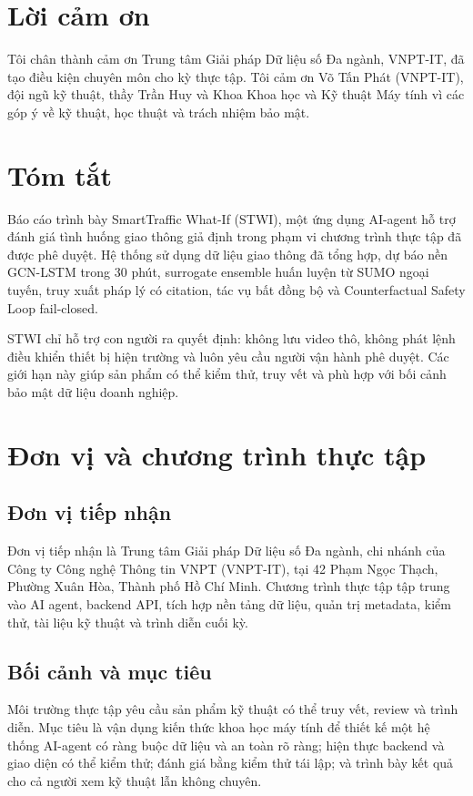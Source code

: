 \documentclass[12pt,a4paper]{report}
\newcommand{\enterpriseMentor}{Võ Tấn Phát (VNPT-IT)}
\begin{document}
\chapter*{Lời cảm ơn}
Tôi chân thành cảm ơn Trung tâm Giải pháp Dữ liệu số Đa ngành, VNPT-IT, đã tạo điều kiện chuyên môn cho kỳ thực tập. Tôi cảm ơn \enterpriseMentor, đội ngũ kỹ thuật, thầy Trần Huy và Khoa Khoa học và Kỹ thuật Máy tính vì các góp ý về kỹ thuật, học thuật và trách nhiệm bảo mật.

\chapter*{Tóm tắt}
Báo cáo trình bày SmartTraffic What-If (STWI), một ứng dụng AI-agent hỗ trợ đánh giá tình huống giao thông giả định trong phạm vi chương trình thực tập đã được phê duyệt. Hệ thống sử dụng dữ liệu giao thông đã tổng hợp, dự báo nền GCN-LSTM trong 30 phút, surrogate ensemble huấn luyện từ SUMO ngoại tuyến, truy xuất pháp lý có citation, tác vụ bất đồng bộ và Counterfactual Safety Loop fail-closed.

STWI chỉ hỗ trợ con người ra quyết định: không lưu video thô, không phát lệnh điều khiển thiết bị hiện trường và luôn yêu cầu người vận hành phê duyệt. Các giới hạn này giúp sản phẩm có thể kiểm thử, truy vết và phù hợp với bối cảnh bảo mật dữ liệu doanh nghiệp.

\tableofcontents
\clearpage
{}

\chapter{Đơn vị và chương trình thực tập}
\section{Đơn vị tiếp nhận}
Đơn vị tiếp nhận là Trung tâm Giải pháp Dữ liệu số Đa ngành, chi nhánh của Công ty Công nghệ Thông tin VNPT (VNPT-IT), tại 42 Phạm Ngọc Thạch, Phường Xuân Hòa, Thành phố Hồ Chí Minh. Chương trình thực tập tập trung vào AI agent, backend API, tích hợp nền tảng dữ liệu, quản trị metadata, kiểm thử, tài liệu kỹ thuật và trình diễn cuối kỳ.

\section{Bối cảnh và mục tiêu}
Môi trường thực tập yêu cầu sản phẩm kỹ thuật có thể truy vết, review và trình diễn. Mục tiêu là vận dụng kiến thức khoa học máy tính để thiết kế một hệ thống AI-agent có ràng buộc dữ liệu và an toàn rõ ràng; hiện thực backend và giao diện có thể kiểm thử; đánh giá bằng kiểm thử tái lập; và trình bày kết quả cho cả người xem kỹ thuật lẫn không chuyên.
\end{document}

